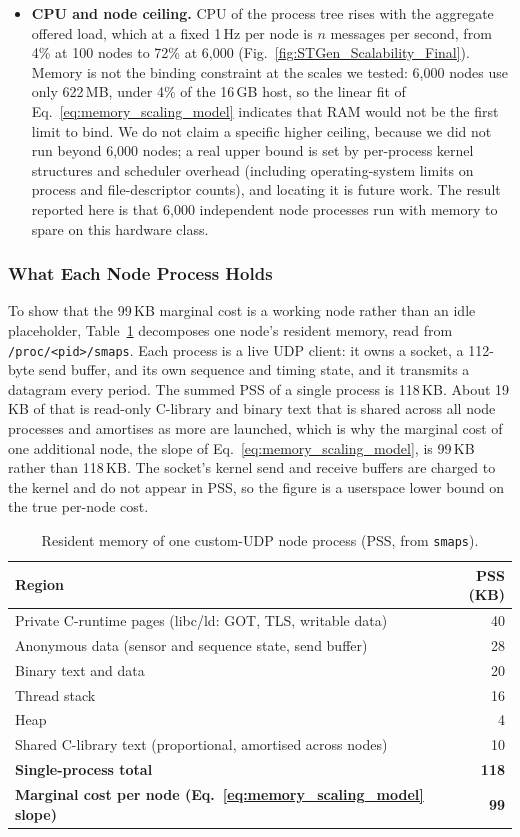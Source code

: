 \documentclass[jsan,article,submit,moreauthors,pdftex]{Definitions/mdpi}
\begin{document}
\begin{itemize}
\item \textbf{CPU and node ceiling.}
CPU of the process tree rises with the aggregate offered load, which at a fixed 1\,Hz per node is $n$ messages per second, from 4\% at 100 nodes to 72\% at 6{,}000 (Fig.~\ref{fig:STGen_Scalability_Final}). Memory is not the binding constraint at the scales we tested: 6{,}000 nodes use only 622\,MB, under 4\% of the 16\,GB host, so the linear fit of Eq.~\eqref{eq:memory_scaling_model} indicates that RAM would not be the first limit to bind. We do not claim a specific higher ceiling, because we did not run beyond 6{,}000 nodes; a real upper bound is set by per-process kernel structures and scheduler overhead (including operating-system limits on process and file-descriptor counts), and locating it is future work. The result reported here is that 6{,}000 independent node processes run with memory to spare on this hardware class.
\end{itemize}

\subsubsection*{What Each Node Process Holds}

To show that the 99\,KB marginal cost is a working node rather than an idle placeholder, Table~\ref{tab:mem-breakdown} decomposes one node's resident memory, read from \texttt{/proc/<pid>/smaps}. Each process is a live UDP client: it owns a socket, a 112-byte send buffer, and its own sequence and timing state, and it transmits a datagram every period. The summed PSS of a single process is 118\,KB. About 19\,KB of that is read-only C-library and binary text that is shared across all node processes and amortises as more are launched, which is why the marginal cost of one additional node, the slope of Eq.~\eqref{eq:memory_scaling_model}, is 99\,KB rather than 118\,KB. The socket's kernel send and receive buffers are charged to the kernel and do not appear in PSS, so the figure is a userspace lower bound on the true per-node cost.

\begin{table}[H]
\centering
\caption{Resident memory of one custom-UDP node process (PSS, from \texttt{smaps}).}
\label{tab:mem-breakdown}
\small
\begin{tabular}{l r}
\hline
\textbf{Region} & \textbf{PSS (KB)} \\ \hline
Private C-runtime pages (libc/ld: GOT, TLS, writable data) & 40 \\
Anonymous data (sensor and sequence state, send buffer) & 28 \\
Binary text and data & 20 \\
Thread stack & 16 \\
Heap & 4 \\
Shared C-library text (proportional, amortised across nodes) & 10 \\ \hline
\textbf{Single-process total} & \textbf{118} \\
\textbf{Marginal cost per node (Eq.~\ref{eq:memory_scaling_model} slope)} & \textbf{99} \\
\hline
\end{tabular}
\end{table}
\end{document}
